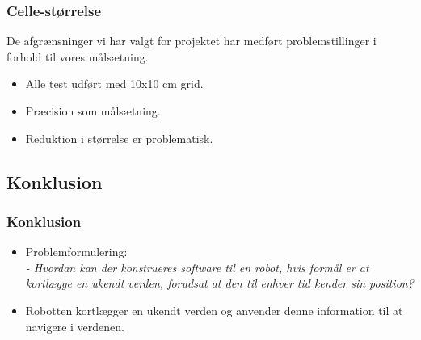 \begin{frame}
\frametitle{Celle-størrelse}
De afgrænsninger vi har valgt for projektet har medført problemstillinger i forhold til vores målsætning.
\begin{itemize}
\item Alle test udført med 10x10 cm grid.
\item Præcision som målsætning.
\item Reduktion i størrelse er problematisk.
\end{itemize}
\end{frame}

\subsection{Konklusion}

\begin{frame}
\frametitle{Konklusion}
\begin{itemize}
\item Problemformulering:\\
\textit{- Hvordan kan der konstrueres software til en robot, hvis formål er at kortlægge en ukendt verden, forudsat at den til enhver tid kender sin position?}
\pause
\item Robotten kortlægger en ukendt verden og anvender denne information til at navigere i verdenen.
\end{itemize}
\end{frame}